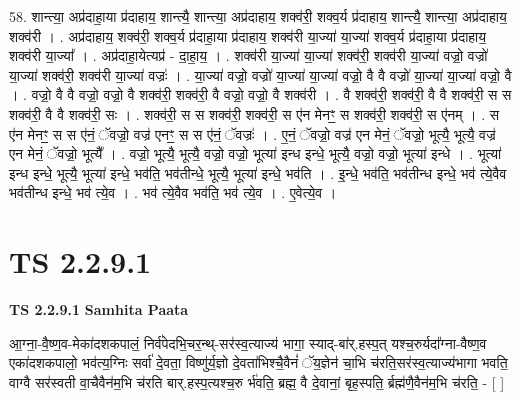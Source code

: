\documentclass[17pt]{extarticle}
\begin{document}
58. शान्त्या॒ अप्र॑दाहा॒या प्र॑दाहाय॒ शान्त्यै॒ शान्त्या॒ अप्र॑दाहाय॒ शक्व॑री॒ शक्व॒र्य प्र॑दाहाय॒ शान्त्यै॒ शान्त्या॒ अप्र॑दाहाय॒ शक्व॑री । . अप्र॑दाहाय॒ शक्व॑री॒ शक्व॒र्य प्र॑दाहा॒या प्र॑दाहाय॒ शक्व॑री या॒ज्या॑ या॒ज्या॑ शक्व॒र्य प्र॑दाहा॒या प्र॑दाहाय॒ शक्व॑री या॒ज्या᳚ । . अप्र॑दाहा॒येत्यप्र॑ - दा॒हा॒य॒ । . शक्व॑री या॒ज्या॑ या॒ज्या॑ शक्व॑री॒ शक्व॑री या॒ज्या॑ वज्रो॒ वज्रो॑ या॒ज्या॑ शक्व॑री॒ शक्व॑री या॒ज्या॑ वज्रः॑ । . या॒ज्या॑ वज्रो॒ वज्रो॑ या॒ज्या॑ या॒ज्या॑ वज्रो॒ वै वै वज्रो॑ या॒ज्या॑ या॒ज्या॑ वज्रो॒ वै । . वज्रो॒ वै वै वज्रो॒ वज्रो॒ वै शक्व॑री॒ शक्व॑री॒ वै वज्रो॒ वज्रो॒ वै शक्व॑री । . वै शक्व॑री॒ शक्व॑री॒ वै वै शक्व॑री॒ स स शक्व॑री॒ वै वै शक्व॑री॒ सः । . शक्व॑री॒ स स शक्व॑री॒ शक्व॑री॒ स ए॑न मेनꣳ॒॒ स शक्व॑री॒ शक्व॑री॒ स ए॑नम् । . स ए॑न मेनꣳ॒॒ स स ए॑नं॒ ॅवज्रो॒ वज्र॑ एनꣳ॒॒ स स ए॑नं॒ ॅवज्रः॑ । . ए॒नं॒ ॅवज्रो॒ वज्र॑ एन मेनं॒ ॅवज्रो॒ भूत्यै॒ भूत्यै॒ वज्र॑ एन मेनं॒ ॅवज्रो॒ भूत्यै᳚ । . वज्रो॒ भूत्यै॒ भूत्यै॒ वज्रो॒ वज्रो॒ भूत्या॑ इन्ध इन्धे॒ भूत्यै॒ वज्रो॒ वज्रो॒ भूत्या॑ इन्धे । . भूत्या॑ इन्ध इन्धे॒ भूत्यै॒ भूत्या॑ इन्धे॒ भव॑ति॒ भव॑तीन्धे॒ भूत्यै॒ भूत्या॑ इन्धे॒ भव॑ति । . इ॒न्धे॒ भव॑ति॒ भव॑तीन्ध इन्धे॒ भव॑ त्ये॒वैव भव॑तीन्ध इन्धे॒ भव॑ त्ये॒व । . भव॑ त्ये॒वैव भव॑ति॒ भव॑ त्ये॒व । . ए॒वेत्ये॒व । \newline
\pagebreak
{}
\section*{ TS 2.2.9.1 }

\textbf{TS 2.2.9.1 } \newline
\textbf{Samhita Paata} \newline

आ॒ग्ना॒-वै॒ष्ण॒व-मेका॑दशकपालं॒ निर्व॑पेदभि॒चर॒न्थ्-सर॑स्व॒त्याज्य॑ भागा॒ स्याद्-बा॑र्.हस्प॒त् यश्च॒रुर्यदा᳚ग्ना-वैष्ण॒व एका॑दशकपालो॒ भव॑त्य॒ग्निः सर्वा॑ दे॒वता॒ विष्णु॑र्य॒ज्ञो दे॒वता॑भिश्चै॒वैनं॑ ॅय॒ज्ञेन॑ चा॒भि च॑रति॒सर॑स्व॒त्याज्य॑भागा भवति॒ वाग्वै सर॑स्वती वा॒चैवैन॑म॒भि च॑रति बार्.हस्प॒त्यश्च॒रु र्भ॑वति॒ ब्रह्म॒ वै दे॒वानां॒ बृह॒स्पति॒ र्ब्रह्म॑णै॒वैन॑म॒भि च॑रति॒ - [  ] \newline
\end{document}
